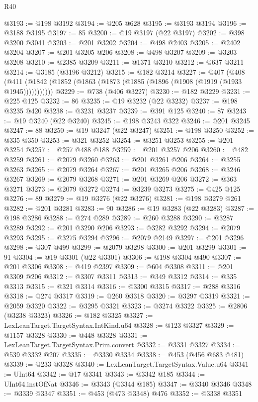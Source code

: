 \begin{lexlean}{R40}
\begin{coremodule}
@3193 := @198 @3192
@3194 := @205 @628
@3195 := @3193 @3194
@3196 := @3188 @3195
@3197 := 85
@3200 := @19 @3197 (@22 @3197)
@3202 := @398 @3200 @3041
@3203 := @201 @3202
@3204 := @498 @2403
@3205 := @2402 @3204
@3207 := @201 @3205 @206
@3208 := @498 @3207
@3209 := @3203 @3208
@3210 := @2385 @3209
@3211 := @1371 @3210
@3212 := @637 @3211
@3214 := @3185 (@3196 @3212)
@3215 := @182 @3214
@3227 := @407
    (@408 (@411 (@1842 (@1852 (@1863 (@1873 (@1885 (@1896 (@1908 (@1919 (@1933 @1945)))))))))))
@3229 := @738 (@406 @3227)
@3230 := @182 @3229
@3231 := @225 @125
@3232 := 86
@3235 := @19 @3232 (@22 @3232)
@3237 := @198 @3235 @420
@3238 := @3231 @3237
@3239 := @391 @125
@3240 := 87
@3243 := @19 @3240 (@22 @3240)
@3245 := @198 @3243 @322
@3246 := @201 @3245
@3247 := 88
@3250 := @19 @3247 (@22 @3247)
@3251 := @198 @3250
@3252 := @335 @350
@3253 := @321 @3252
@3254 := @3251 @3253
@3255 := @201 @3254
@3257 := @257 @488 @188
@3259 := @201 @3257 @206
@3260 := @482 @3259
@3261 := @2079 @3260
@3263 := @201 @3261 @206
@3264 := @3255 @3263
@3265 := @2079 @3264
@3267 := @201 @3265 @206
@3268 := @3246 @3267
@3269 := @2079 @3268
@3271 := @201 @3269 @206
@3272 := @363 @3271
@3273 := @2079 @3272
@3274 := @3239 @3273
@3275 := @425 @125
@3276 := 89
@3279 := @19 @3276 (@22 @3276)
@3281 := @198 @3279 @261
@3282 := @201 @3281
@3283 := 90
@3286 := @19 @3283 (@22 @3283)
@3287 := @198 @3286
@3288 := @274 @289
@3289 := @260 @3288
@3290 := @3287 @3289
@3292 := @201 @3290 @206
@3293 := @3282 @3292
@3294 := @2079 @3293
@3295 := @3275 @3294
@3296 := @2079 @2149
@3297 := @201 @3296
@3298 := @307 @499
@3299 := @2079 @3298
@3300 := @201 @3299
@3301 := 91
@3304 := @19 @3301 (@22 @3301)
@3306 := @198 @3304 @490
@3307 := @201 @3306
@3308 := @419 @2397
@3309 := @604 @3308
@3311 := @201 @3309 @206
@3312 := @3307 @3311
@3313 := @349 @3312
@3314 := @335 @3313
@3315 := @321 @3314
@3316 := @3300 @3315
@3317 := @288 @3316
@3318 := @274 @3317
@3319 := @260 @3318
@3320 := @3297 @3319
@3321 := @2059 @3320
@3322 := @3295 @3321
@3323 := @3274 @3322
@3325 := @2806 (@3238 @3323)
@3326 := @182 @3325
@3327 := LexLeanTarget.TargetSyntax.IntKind.u64
@3328 := @123 @3327
@3329 := @1157 @3328
@3330 := @448 @3328
@3331 := LexLeanTarget.TargetSyntax.Prim.convert
@3332 := @3331 @3327
@3334 := @539 @3332 @207
@3335 := @3330 @3334
@3338 := @453 (@456 @683 @481)
@3339 := @233 @3328
@3340 := LexLeanTarget.TargetSyntax.Value.u64
@3341 := UInt64
@3342 := @17 @3341
@3343 := @3342 @185
@3344 := UInt64.instOfNat
@3346 := @3343 (@3344 @185)
@3347 := @3340 @3346
@3348 := @3339 @3347
@3351 := @453 (@473 @3348) @476
@3352 := @3338 @3351

\end{coremodule}
\end{lexlean}
